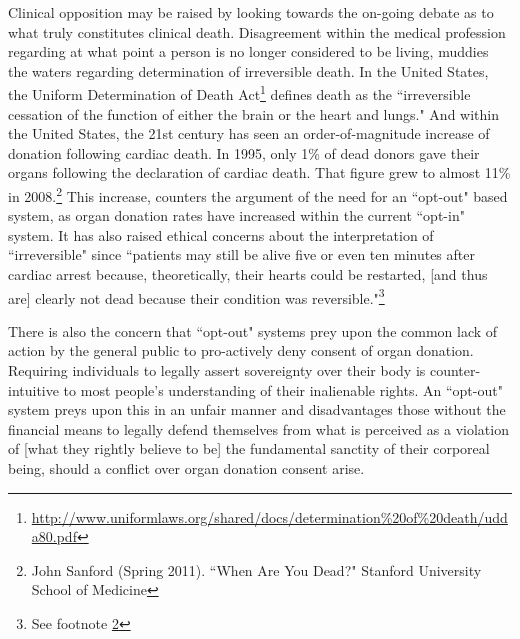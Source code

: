 \documentclass[letterpaper,10pt,twoside]{article}
\begin{document}
Clinical opposition may be raised by looking towards the on-going debate as to what truly constitutes clinical death.  Disagreement within the medical profession regarding at what point a person is no longer considered to be living, muddies the waters regarding determination of irreversible death.  In the United States, the Uniform Determination of Death Act\footnote{\url{http://www.uniformlaws.org/shared/docs/determination\%20of\%20death/udda80.pdf}} defines death as the ``irreversible cessation of the function of either the brain or the heart and lungs."  And within the United States, the 21st century has seen an order-of-magnitude increase of donation following cardiac death.  In 1995, only 1\% of dead donors gave their organs following the declaration of cardiac death.  That figure grew to almost 11\% in 2008.\footnote{\label{When are you dead}John Sanford (Spring 2011). ``When Are You Dead?" Stanford University School of Medicine}  This increase, counters the argument of the need for an ``opt-out" based system, as organ donation rates have increased within the current ``opt-in" system.  It has also raised ethical concerns about the interpretation of ``irreversible" since ``patients may still be alive five or even ten minutes after cardiac arrest because, theoretically, their hearts could be restarted, [and thus are] clearly not dead because their condition was reversible."\footnote{See footnote \ref{When are you dead}}  

There is also the concern that ``opt-out" systems prey upon the common lack of action by the general public to pro-actively deny consent of organ donation.  Requiring individuals to legally assert sovereignty over their body is counter-intuitive to most people's understanding of their inalienable rights.  An ``opt-out" system preys upon this in an unfair manner and disadvantages those without the financial means to legally defend themselves from what is perceived as a violation of [what they rightly believe to be] the fundamental sanctity of their corporeal being, should a conflict over organ donation consent arise.
\end{document}
